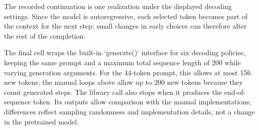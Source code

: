 \documentclass[../labs.tex]{subfiles}
\begin{document}
The recorded continuation is one realization under the displayed decoding settings. Since the model is autoregressive, each selected token becomes part of the context for the next step; small changes in early choices can therefore alter the rest of the completion.


The final cell wraps the built-in `generate()` interface for six decoding policies, keeping the same prompt and a maximum total sequence length of 200 while varying generation arguments. For the 44-token prompt, this allows at most 156 new tokens; the manual loops above allow up to 200 new tokens because they count generated steps. The library call also stops when it produces the end-of-sequence token. Its outputs allow comparison with the manual implementations; differences reflect sampling randomness and implementation details, not a change in the pretrained model.

\end{document}
